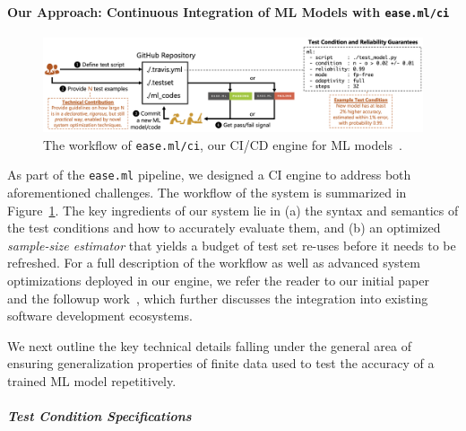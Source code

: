 \documentclass[11pt]{article}
\begin{document}
\paragraph{Our Approach: Continuous Integration of ML Models with \texttt{ease.ml/ci}}

\begin{figure}
\centering
\includegraphics[width=1.0\textwidth]{submissions/data-quality-ml-ops/figs/ci.png}
\caption{The workflow of \texttt{ease.ml/ci}, our CI/CD engine for ML models~\cite{renggli2019continuous}.}
\label{fig:ci}
\end{figure}

As part of the \texttt{ease.ml} pipeline, we designed a CI engine to address both aforementioned challenges. The workflow of the system is summarized in Figure~\ref{fig:ci}. The key ingredients of our system lie in (a) the syntax and semantics of the test conditions and how to accurately evaluate them, and (b) an optimized \emph{sample-size estimator} that yields a budget of test set re-uses before it needs to be refreshed. For a full description of the workflow as well as advanced system optimizations deployed in our engine, we refer the reader to our initial paper~\cite{renggli2019continuous} and the followup work~\cite{karlavs2020building}, which further discusses the integration into existing software development ecosystems.

We next outline the key technical details falling under the 
general area of ensuring generalization properties of finite data used to test the accuracy of a trained ML model repetitively.

\subparagraph{Test Condition Specifications}
\end{document}
